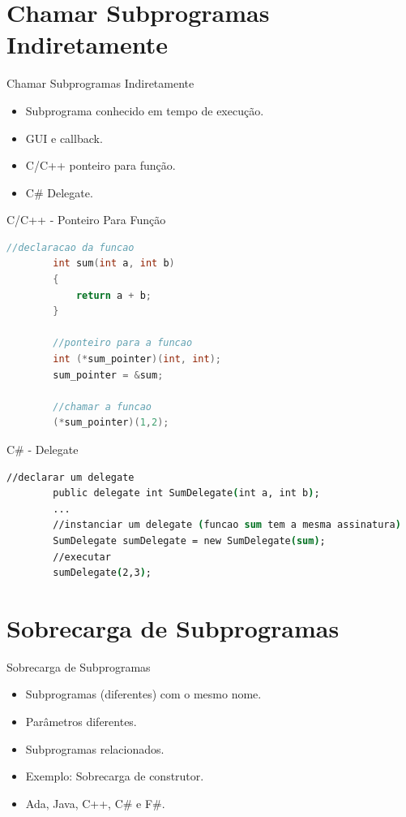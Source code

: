 \section{Chamar Subprogramas Indiretamente}
\begin{frame}{Chamar Subprogramas Indiretamente}
	\begin{itemize}
	  \item Subprograma conhecido em tempo de execução.
	  \item GUI e callback.
	  \item C/C++ ponteiro para função.
	  \item C\# Delegate.
	\end{itemize}
\end{frame}

\begin{frame}[fragile]{C/C++ - Ponteiro Para Função}
	\begin{lstlisting}[language=c]
		//declaracao da funcao
		int sum(int a, int b)
		{
			return a + b;
		}

		//ponteiro para a funcao
		int (*sum_pointer)(int, int);
		sum_pointer = &sum;
		
		//chamar a funcao
		(*sum_pointer)(1,2);
	\end{lstlisting}
\end{frame}

\begin{frame}[fragile]{C\# - Delegate}
	\begin{lstlisting}[language=csh]
		//declarar um delegate
		public delegate int SumDelegate(int a, int b);
		...
		//instanciar um delegate (funcao sum tem a mesma assinatura)
		SumDelegate sumDelegate = new SumDelegate(sum);
		//executar
		sumDelegate(2,3);
	\end{lstlisting}
\end{frame}

\section{Sobrecarga de Subprogramas}
\begin{frame}{Sobrecarga de Subprogramas}
	\begin{itemize}
	  \item Subprogramas (diferentes) com o mesmo nome.
	  \item Parâmetros diferentes.
	  \item Subprogramas relacionados.
	  \item Exemplo: Sobrecarga de construtor.
	  \item Ada, Java, C++, C\# e F\#.
	\end{itemize}
\end{frame}